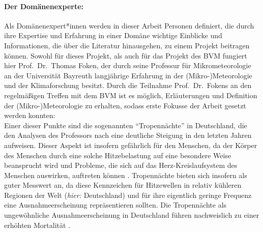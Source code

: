 \paragraph{Der Domänenexperte:}
Als Domänenexpert*innen werden in dieser Arbeit Personen definiert, die durch ihre Expertise und Erfahrung in einer Domäne wichtige Einblicke und Informationen, die über die Literatur hinausgehen, zu einem Projekt beitragen können. Sowohl für dieses Projekt, als auch für das Projekt des \ac{BVM} fungiert hier Prof.\ Dr.\ Thomas Foken, der durch seine Professur für Mikrometeorologie an der Universität Bayreuth langjährige Erfahrung in der (Mikro-)Meteorologie und der Klimaforschung besitzt. Durch die Teilnahme Prof.\ Dr.\ Fokens an den regelmäßigen Treffen mit dem \ac{BVM} ist es möglich, Erläuterungen und Definition der (Mikro-)Meteorologie zu erhalten, sodass erste Fokusse der Arbeit gesetzt werden konnten: \\ Einer dieser Punkte sind die sogenannten \enquote{Tropennächte} in Deutschland, die den Analysen des Professors nach eine deutliche Steigung in den letzten Jahren aufweisen. Dieser Aspekt ist insofern gefährlich für den Menschen, da der Körper des Menschen durch eine solche Hitzebelastung auf eine besondere Weise beansprucht wird und Probleme, die sich auf das Herz-Kreislaufsystem des Menschen auswirken, auftreten können \cite{Umweltbundesamt2023Hitze}. Tropennächte bieten sich insofern als guter Messwert an, da diese Kennzeichen für Hitzewellen in relativ kühleren Regionen der Welt (\textit{hier:} Deutschland) und für ihre eigentlich geringe Frequenz eine Ausnahmeerscheinung repräsentieren sollten. Die Tropennächte als ungewöhnliche Ausnahmeerscheinung in Deutschland führen nachweislich zu einer erhöhten Mortalität \cite{fenner2015innerstadtische}.


